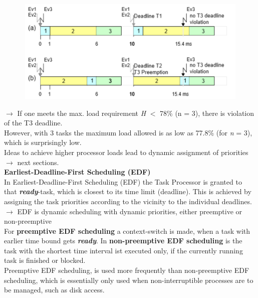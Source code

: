 	\begin{figure}[h]
    \centering
    \includegraphics[width=12cm, height=5cm]{Images/image187.png}
    \label{fig:Fig 46}
    \end{figure}
\newpage   
$\rightarrow$ If one meets the max. load requirement \textit{H} $\mathrm{<}$ 78\% (n = 3), there is violation of the T3 deadline.\\

However, with 3 tasks the maximum load allowed is as low as 77.8\% (for \textit{n} = 3), which is surprisingly low.\\

Ideas to achieve higher processor loads lead to dynamic assignment of priorities \\
$\rightarrow$ next sections.\\

{\rot\bf Earliest-Deadline-First Scheduling (EDF)}\\

In Earliest-Deadline-First Scheduling (EDF) the Task Processor is granted to that \textbf{\textit{ready}}-task, which is closest to its time limit (deadline). This is achieved by assigning the task priorities according to the vicinity to the individual deadlines.\\

$\rightarrow$ EDF is dynamic scheduling with dynamic priorities, either preemptive or non-preemptive\\

For \textbf{preemptive EDF scheduling} a context-switch is made, when a task with earlier time bound gets \textbf{\textit{ready}}. In \textbf{non-preemptive EDF scheduling} is the task with the shortest time interval ist executed only, if the currently running task is finished or blocked.\\

Preemptive EDF scheduling, is used more frequently than non-preemptive EDF scheduling, which is essentially only used when non-interruptible processes are to be managed, such as disk access.\\


